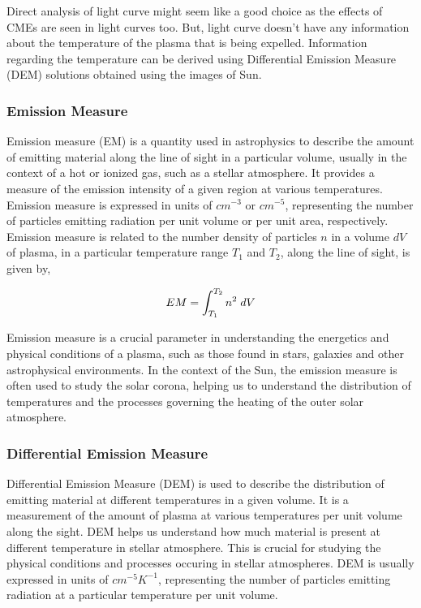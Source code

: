 Direct analysis of light curve might seem like a good choice as the effects of CMEs are seen in light curves too. But, light curve doesn't have any information about the temperature of the plasma that is being expelled. Information regarding the temperature can be derived using Differential Emission Measure (DEM) solutions obtained using the images of Sun.

\subsubsection{Emission Measure}

Emission measure (EM) is a quantity used in astrophysics to describe the amount of emitting material along the line of sight in a particular volume, usually in the context of a hot or ionized gas, such as a stellar atmosphere. It provides a measure of the emission intensity of a given region at various temperatures. Emission measure is expressed in units of $cm^{-3}$ or $cm^{-5}$, representing the number of particles emitting radiation per unit volume or per unit area, respectively.\\

Emission measure is related to the number density of particles $n$ in a volume $dV$ of plasma, in a particular temperature range $T_1$ and $T_2$, along the line of sight, is given by,

\vspace{-0.75cm}
\begin{center}
    \begin{equation*}
        EM = \int_{T_1}^{T_2} n^2 \hspace{0.1cm} dV
    \end{equation*}
\end{center}

Emission measure is a crucial parameter in understanding the energetics and physical conditions of a plasma, such as those found in stars, galaxies and other astrophysical environments. In the context of the Sun, the emission measure is often used to study the solar corona, helping us to understand the distribution of temperatures and the processes governing the heating of the outer solar atmosphere.

\subsubsection{Differential Emission Measure}

Differential Emission Measure (DEM) is used to describe the distribution of emitting material at different temperatures in a given volume. It is a measurement of the amount of plasma at various temperatures per unit volume along the sight. DEM helps us understand how much material is present at different temperature in stellar atmosphere. This is crucial for studying the physical conditions and processes occuring in stellar atmospheres. DEM is usually expressed in units of $cm^{-5}K^{-1}$, representing the number of particles emitting radiation at a particular temperature per unit volume.

